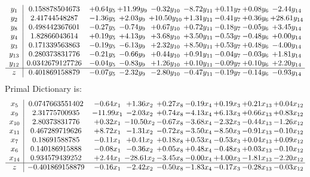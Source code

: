 \documentclass[8pt]{article}
\begin{document}
\[\begin{array}{c| c c@{\hskip 2pt} c@{\hskip 2pt} c@{\hskip 2pt} c@{\hskip 2pt} c@{\hskip 2pt} c@{\hskip 2pt} c@{\hskip 2pt} }
 y_{1}   &  0.158878504673 & +  0.64 y_{5} & + 11.99 y_{9} & -0.32 y_{10} & -8.72 y_{11} & +  0.11 y_{7} & +  0.08 y_{6} & -2.44 y_{14}\\
 y_{2}   &  2.41744548287 & -1.36 y_{5} & +  2.03 y_{9} & + 10.50 y_{10} & +  1.31 y_{11} & -0.41 y_{7} & +  0.36 y_{6} & + 28.61 y_{14}\\
 y_{8}   &  0.498442367601 & -0.27 y_{5} & -0.74 y_{9} & +  0.67 y_{10} & +  0.72 y_{11} & -0.18 y_{7} & -0.05 y_{6} & +  3.45 y_{14}\\
 y_{4}   &  1.82866043614 & +  0.19 y_{5} & +  4.13 y_{9} & +  3.68 y_{10} & +  3.50 y_{11} & -0.53 y_{7} & -0.48 y_{6} & +  0.00 y_{14}\\
 y_{3}   &  0.171339563863 & -0.19 y_{5} & -6.13 y_{9} & +  2.32 y_{10} & +  8.50 y_{11} & +  0.53 y_{7} & +  0.48 y_{6} & -4.00 y_{14}\\
 y_{13}   &  0.280373831776 & -0.21 y_{5} & -0.66 y_{9} & +  0.44 y_{10} & +  0.91 y_{11} & -0.04 y_{7} & -0.03 y_{6} & +  1.81 y_{14}\\
 y_{12}   &  0.0342679127726 & -0.04 y_{5} & -0.83 y_{9} & +  1.26 y_{10} & +  0.10 y_{11} & -0.09 y_{7} & +  0.10 y_{6} & +  2.20 y_{14}\\
\hline
z    &  0.401869158879 & -0.07 y_{5} & -2.32 y_{9} & -2.80 y_{10} & -0.47 y_{11} & -0.19 y_{7} & -0.14 y_{6} & -0.93 y_{14}\\
\end{array}\]
Primal Dictionary is:
\[\begin{array}{c| c c@{\hskip 2pt} c@{\hskip 2pt} c@{\hskip 2pt} c@{\hskip 2pt} c@{\hskip 2pt} c@{\hskip 2pt} c@{\hskip 2pt} }
 x_{5}   &  0.0747663551402 & -0.64 x_{1} & +  1.36 x_{2} & +  0.27 x_{8} & -0.19 x_{4} & +  0.19 x_{3} & +  0.21 x_{13} & +  0.04 x_{12}\\
 x_{9}   &  2.31775700935 & -11.99 x_{1} & -2.03 x_{2} & +  0.74 x_{8} & -4.13 x_{4} & +  6.13 x_{3} & +  0.66 x_{13} & +  0.83 x_{12}\\
 x_{10}   &  2.80373831776 & +  0.32 x_{1} & -10.50 x_{2} & -0.67 x_{8} & -3.68 x_{4} & -2.32 x_{3} & -0.44 x_{13} & -1.26 x_{12}\\
 x_{11}   &  0.467289719626 & +  8.72 x_{1} & -1.31 x_{2} & -0.72 x_{8} & -3.50 x_{4} & -8.50 x_{3} & -0.91 x_{13} & -0.10 x_{12}\\
 x_{7}   &  0.18691588785 & -0.11 x_{1} & +  0.41 x_{2} & +  0.18 x_{8} & +  0.53 x_{4} & -0.53 x_{3} & +  0.04 x_{13} & +  0.09 x_{12}\\
 x_{6}   &  0.140186915888 & -0.08 x_{1} & -0.36 x_{2} & +  0.05 x_{8} & +  0.48 x_{4} & -0.48 x_{3} & +  0.03 x_{13} & -0.10 x_{12}\\
 x_{14}   &  0.934579439252 & +  2.44 x_{1} & -28.61 x_{2} & -3.45 x_{8} & -0.00 x_{4} & +  4.00 x_{3} & -1.81 x_{13} & -2.20 x_{12}\\
\hline
z    &  -0.401869158879 & -0.16 x_{1} & -2.42 x_{2} & -0.50 x_{8} & -1.83 x_{4} & -0.17 x_{3} & -0.28 x_{13} & -0.03 x_{12}\\
\end{array}\]
\end{document}
